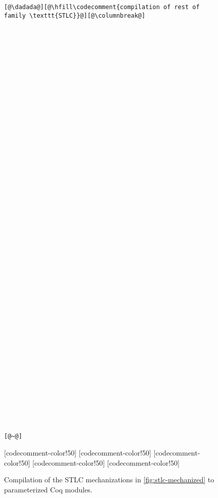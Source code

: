 \begin{figure}
\begin{minipage}{\textwidth}
\begin{multicols}{2}
\begin{lstlisting}
[@\dadada@][@\hfill\codecomment{compilation of rest of family \texttt{STLC}}@][@\columnbreak@]

















































[@~@]
\end{lstlisting}

[codecomment-color!50]
[codecomment-color!50]
[codecomment-color!50]
[codecomment-color!50]
[codecomment-color!50]

\end{multicols}
\end{minipage}
\caption{Compilation of the STLC mechanizations in \cref{fig:stlc-mechanized} to parameterized Coq modules.}
\label{fig:stlc-compiled}
\end{figure}